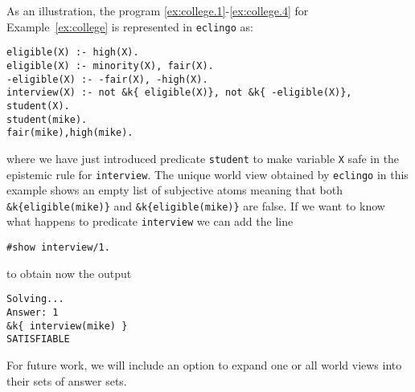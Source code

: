 \documentclass{new_tlp}
\def\eclingo{{\tt eclingo}}
\begin{document}
As an illustration, the program \eqref{ex:college.1}-\eqref{ex:college.4} for Example~\ref{ex:college} is represented in \eclingo{} as:
\begin{Verbatim}[frame=single]
eligible(X) :- high(X).
eligible(X) :- minority(X), fair(X).
-eligible(X) :- -fair(X), -high(X).
interview(X) :- not &k{ eligible(X)}, not &k{ -eligible(X)}, student(X).
student(mike).
fair(mike),high(mike).
\end{Verbatim}
where we have just introduced predicate {\tt student} to make variable {\tt X} safe in the epistemic rule for {\tt interview}.
%
The unique world view obtained by \eclingo{} in this example shows an empty list of subjective atoms meaning that both \mbox{\tt \&k\{eligible(mike)\}} and \mbox{\tt \&k\{eligible(mike)\}} are false.
%
If we want to know what happens to predicate {\tt interview} we can add the line
\begin{Verbatim}[frame=single]
#show interview/1.
\end{Verbatim}
to obtain now the output
\begin{Verbatim}[frame=single]
Solving...
Answer: 1
&k{ interview(mike) }
SATISFIABLE
\end{Verbatim}
For future work, we will include an option to expand one or all world views into their sets of answer sets.
\end{document}
